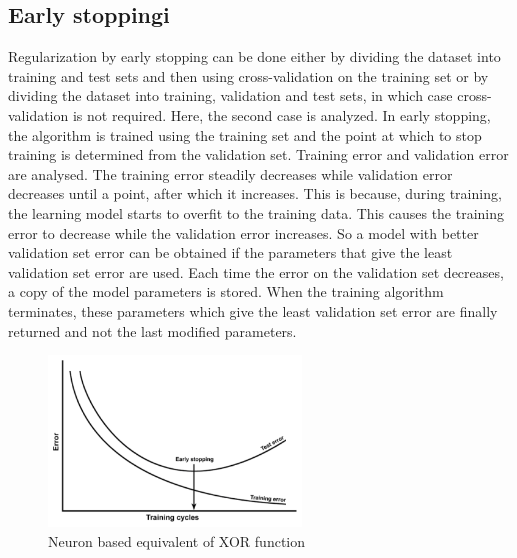 \subsection{Early stoppingi}
\FloatBarrier
Regularization by early stopping can be done either by dividing the dataset into training and test 
sets and then using cross-validation on the training set or by dividing the dataset into training, 
validation and test sets, in which case cross-validation is not required.
Here, the second case is analyzed. In early stopping, the algorithm is trained using the
training set and the point at which to stop training is determined from the validation set. 
Training error and validation error are analysed. The training error steadily decreases while 
validation error decreases until a point, after which it increases. 
This is because, during training, the learning model starts to overfit to the training data. 
This causes the training error to decrease while the validation error increases.
So a model with better validation set error can be obtained if the parameters that give the least
validation set error are used.
Each time the error on the validation set decreases, a copy of the model parameters is stored.
When the training algorithm terminates, these parameters which give the least validation set
error are finally returned and not the last modified parameters. 
\begin{figure}[htb] 
	\label{fig:early_stop}
	\centering
	\includegraphics[width=0.6\textwidth]{figures/early_stop}
	\caption{Neuron based equivalent of XOR function}
\end{figure}

